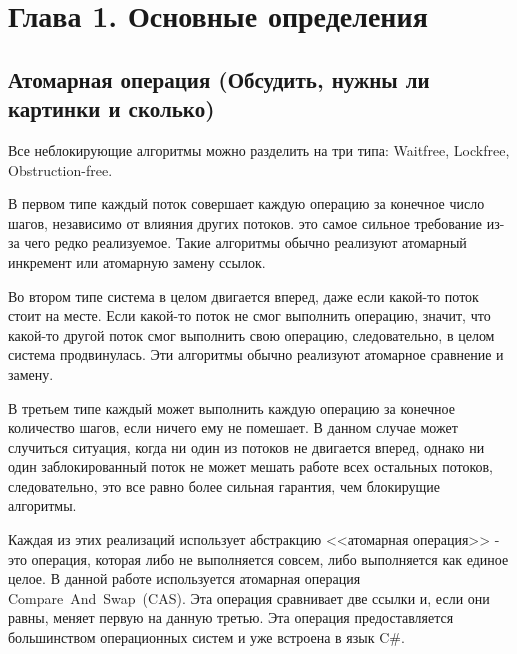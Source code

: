 \documentclass[12pt]{article}
\begin{document}
{		\newpage
		
		\section{Глава 1. Основные определения}
			\subsection{Атомарная операция (Обсудить, нужны ли картинки и сколько)}
				\par Все неблокирующие алгоритмы можно разделить на три типа: Waitfree, Lockfree, Obstruction-free\cite{WaitFree}.
				\par В первом типе каждый поток совершает каждую операцию за конечное число шагов, независимо от влияния других потоков. это самое сильное требование из-за чего редко реализуемое. Такие алгоритмы обычно реализуют атомарный инкремент или атомарную замену ссылок.
				\par Во втором типе система в целом двигается вперед, даже если какой-то поток стоит на месте. Если какой-то поток не смог выполнить операцию, значит, что какой-то другой поток смог выполнить свою операцию, следовательно, в целом система продвинулась. Эти алгоритмы обычно реализуют атомарное сравнение и замену.
				\par В третьем типе каждый может выполнить каждую операцию за конечное количество шагов, если ничего ему не помешает. В данном случае может случиться ситуация, когда ни один из потоков не двигается вперед, однако ни один заблокированный поток не может мешать работе всех остальных потоков, следовательно, это все равно более сильная гарантия, чем блокирущие алгоритмы.
				\par Каждая из этих реализаций использует абстракцию <<атомарная операция>> - это операция, которая либо не выполняется совсем, либо выполняется как единое целое. В данной работе используется атомарная операция Compare~And~Swap~(CAS). Эта операция сравнивает две ссылки и, если они равны, меняет первую на данную третью. Эта операция предоставляется большинством операционных систем и уже встроена в язык C\#.
}
\end{document}
